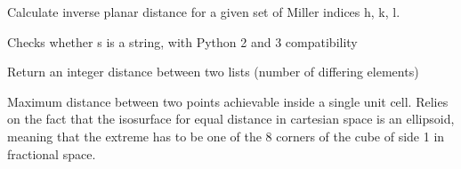 \documentclass[letterpaper,10pt,english]{sphinxmanual}
\begin{document}

\begin{fulllineitems}
\label{doctree/soprano.utils:soprano.utils.inv_plane_dist}
Calculate inverse planar distance for a given set of
Miller indices h, k, l.

\end{fulllineitems}


\begin{fulllineitems}
\label{doctree/soprano.utils:soprano.utils.is_string}
Checks whether s is a string, with Python 2 and 3 compatibility

\end{fulllineitems}


\begin{fulllineitems}
\label{doctree/soprano.utils:soprano.utils.list_distance}
Return an integer distance between two lists (number of differing
elements)

\end{fulllineitems}


\begin{fulllineitems}
\label{doctree/soprano.utils:soprano.utils.max_distance_in_cell}
Maximum distance between two points achievable inside a single unit 
cell.
Relies on the fact that the isosurface for equal distance in cartesian
space is an ellipsoid, meaning that the extreme has to be one of the 8
corners of the cube of side 1 in fractional space.

\end{fulllineitems}

\end{document}
